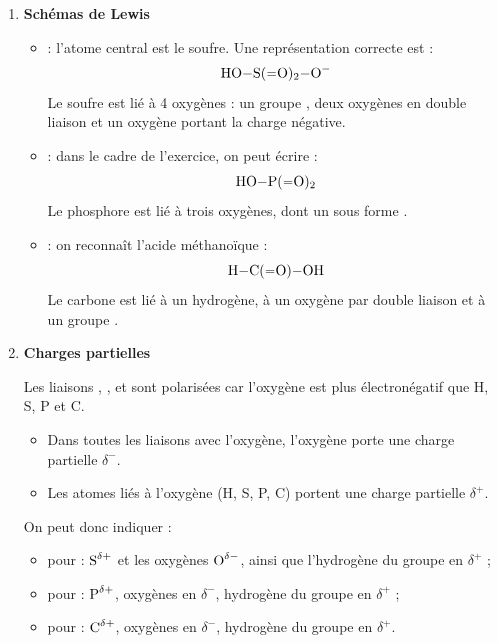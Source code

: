 \documentclass[a4paper,fontsize=11pt,fleqn]{scrartcl}
\begin{document}
\begin{enumerate}
    \item \textbf{Schémas de Lewis}

    \begin{itemize}
        \item \textbf{} : l'atome central est le soufre.  
        Une représentation correcte est :
        \[
        \ce{HO-S(=O)2-O^-}
        \]
        Le soufre est lié à 4 oxygènes : un groupe , deux oxygènes en double liaison et un oxygène portant la charge négative.

        \item \textbf{} : dans le cadre de l'exercice, on peut écrire :
        \[
        \ce{HO-P(=O)2}
        \]
        Le phosphore est lié à trois oxygènes, dont un sous forme .

        \item \textbf{} : on reconnaît l'acide méthanoïque :
        \[
        \ce{H-C(=O)-OH}
        \]
        Le carbone est lié à un hydrogène, à un oxygène par double liaison et à un groupe .
    \end{itemize}

    \item \textbf{Charges partielles}

    Les liaisons , ,  et  sont polarisées car l'oxygène est plus électronégatif que H, S, P et C.

    \begin{itemize}
        \item Dans toutes les liaisons avec l'oxygène, l'oxygène porte une charge partielle \(\delta^-\).
        \item Les atomes liés à l'oxygène (H, S, P, C) portent une charge partielle \(\delta^+\).
    \end{itemize}

    On peut donc indiquer :
    \begin{itemize}
        \item pour  : \(\ce{S^{\delta+}}\) et les oxygènes \(\ce{O^{\delta-}}\), ainsi que l'hydrogène du groupe  en \(\delta^+\) ;
        \item pour  : \(\ce{P^{\delta+}}\), oxygènes en \(\delta^-\), hydrogène du groupe  en \(\delta^+\) ;
        \item pour  : \(\ce{C^{\delta+}}\), oxygènes en \(\delta^-\), hydrogène du groupe  en \(\delta^+\).
    \end{itemize}


\end{enumerate}
\end{document}

